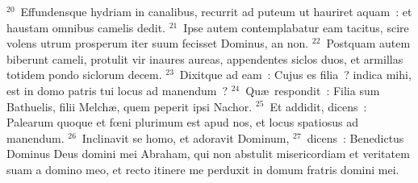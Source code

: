 ${}^{20}$~Effundensque hydriam in canalibus, recurrit ad puteum ut hauriret aquam~: et haustam omnibus camelis dedit.
${}^{21}$~Ipse autem contemplabatur eam tacitus, scire volens utrum prosperum iter suum fecisset Dominus, an non.
${}^{22}$~Postquam autem biberunt cameli, protulit vir inaures aureas, appendentes siclos duos, et armillas totidem pondo siclorum decem.
${}^{23}$~Dixitque ad eam~: Cujus es filia~? indica mihi, est in domo patris tui locus ad manendum~?
${}^{24}$~Qu\ae\ respondit~: Filia sum Bathuelis, filii Melch\ae , quem peperit ipsi Nachor.
${}^{25}$~Et addidit, dicens~: Palearum quoque et fœni plurimum est apud nos, et locus spatiosus ad manendum.
${}^{26}$~Inclinavit se homo, et adoravit Dominum,
${}^{27}$~dicens~: Benedictus Dominus Deus domini mei Abraham, qui non abstulit misericordiam et veritatem suam a domino meo, et recto itinere me perduxit in domum fratris domini mei.


